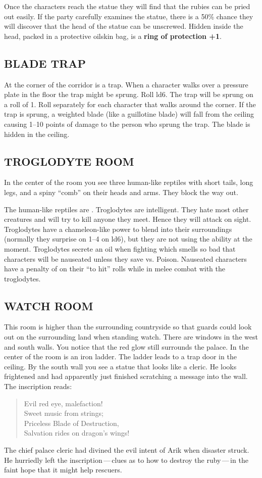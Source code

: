 \documentclass[letterpaper,serif,tightsqueeze]{module}
\begin{document}
Once the characters reach the statue they will find that the rubies
can be pried out easily. If the party carefully examines the statue,
there is a 50\% chance they will discover that the head of the statue
can be unscrewed. Hidden inside the head, packed in a protective
oilskin bag, is a \textbf{ring of protection +1}.
\subsection{BLADE TRAP}
At the corner of the corridor is a trap. When a character walks over
a pressure plate in the floor the trap might be sprung. Roll ld6. The
trap will be sprung on a roll of 1. Roll separately for each character
that walks around the corner. If the trap is sprung, a weighted
blade (like a guillotine blade) will fall from the ceiling causing 1--10
points of damage to the person who sprung the trap. The blade is
hidden in the ceiling.
\subsection{TROGLODYTE ROOM}
\begin{boxtext}
In the center of the room you see three human-like reptiles with
short tails, long legs, and a spiny ``comb'' on their heads and
arms. They block the way out.
\end{boxtext}
The human-like reptiles are .
Troglodytes are intelligent. They hate most other creatures and will try to kill
anyone they meet. Hence they will attack on sight. Troglodytes
have a chameleon-like power to blend into their surroundings
(normally they surprise on 1--4 on ld6), but they are not using the
ability at the moment. Troglodytes secrete an oil when fighting
which smells so bad that characters will be nauseated unless they
save vs. Poison. Nauseated characters have a penalty of  on their
``to hit'' rolls while in melee combat with the troglodytes.
\subsection{WATCH ROOM}
\begin{boxtext}
This room is higher than the surrounding countryside so that
guards could look out on the surrounding land when standing
watch. There are windows in the west and south walls. You
notice that the red glow still surrounds the palace. In the center
of the room is an iron ladder. The ladder leads to a trap door in
the ceiling. By the south wall you see a statue that looks like a
cleric. He looks frightened and had apparently just finished
scratching a message into the wall. The inscription reads:
\begin{quote}
Evil red eye, malefaction!\\
Sweet music from strings;\\
Priceless Blade of Destruction,\\
Salvation rides on dragon's wings!
\end{quote}
\end{boxtext}
The chief palace cleric had divined the evil intent of Arik when
disaster struck. He hurriedly left the inscription\,---\,clues as to how
to destroy the ruby\,---\,in the faint hope that it might help rescuers.
\end{document}
